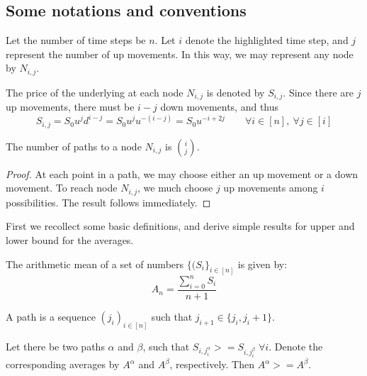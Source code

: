 \subsection*{Some notations and conventions}
Let the number of time steps be $n$. Let $i$ denote the highlighted time step, and $j$ represent the number of up movements. In this way, we may represent any node by $ N_{i,j} $.

The price of the underlying at each node $ N_{i,j} $ is denoted by $ S_{i,j} $. Since there are $j$ up movements, there must be $ i-j $ down movements, and thus
\begin{equation}
S_{i,j} = S_0 u^{j} d^{i-j} = S_0 u^{j} u^{-(i-j)} = S_0 u^{-i+2j} \qquad \forall i \in [n], \ \forall j \in [i]
\end{equation}

\begin{prp}
	The number of paths to a node $ N_{i,j} $ is $ \binom{i}{j} $.
\end{prp}
\begin{proof}
	At each point in a path, we may choose either an up movement or a down movement. To reach node $ N_{i,j} $, we much choose $j$ up movements among $i$ possibilities. The result follows immediately.
\end{proof}

First we recollect some basic definitions, and derive simple results for upper and lower bound for the averages.


\begin{dfn}
	The arithmetic mean of a set of numbers $ \{( S_i \}_{i \in [n]} $ is given by:
	\begin{equation}
	\label{eq:am}
	A_{n} = \frac{\sum_{i=0}^n S_i}{n+1}
	\end{equation}
\end{dfn}


\begin{dfn}[Path]
	A path is a sequence $(j_i)_{i \in [n]}$ such that $j_{i+1} \in \{ j_i,j_i+1 \}$.
\end{dfn}


\begin{thm}
	\label{thm:up-dn-path}
	Let there be two paths $\alpha$ and $\beta$, such that $S_{i,j_i^\alpha} >= S_{i,j_i^\beta} \; \forall i$. Denote the corresponding averages by $A^\alpha$ and $A^\beta$, respectively. Then $ A^\alpha >= A^\beta $.
\end{thm}

